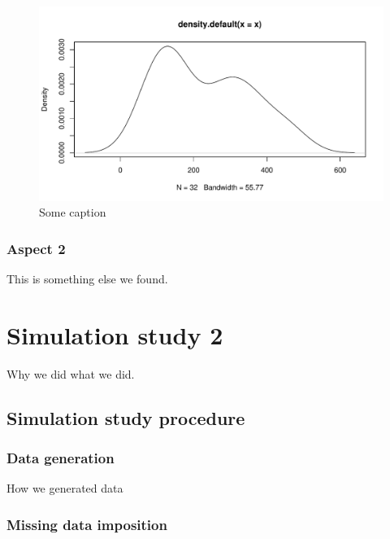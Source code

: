 \documentclass[a4paper,doc,floatsintext,natbib]{apa6}\usepackage[]{graphicx}\usepackage[]{xcolor}
\makeatletter
\def\maxwidth{ %
  \ifdim\Gin@nat@width>\linewidth
    \linewidth
  \else
    \Gin@nat@width
  \fi
}
\newenvironment{knitrout}{}{} %
\makeatother
\begin{document}
	\begin{figure}
	\centering
\begin{knitrout}
\color{fgcolor}

{\centering \includegraphics[width=\maxwidth]{figure/plot-pdf-1} 

}


\end{knitrout}
		\caption{\label{fig:dist} Some caption }
	\end{figure}

\subsubsection{Aspect 2}

	This is something else we found.
    
\section{Simulation study 2}

	Why we did what we did.

\subsection{Simulation study procedure}

\subsubsection{Data generation}

	How we generated data	

\subsubsection{Missing data imposition}\label{sub-missing}
\end{document}
